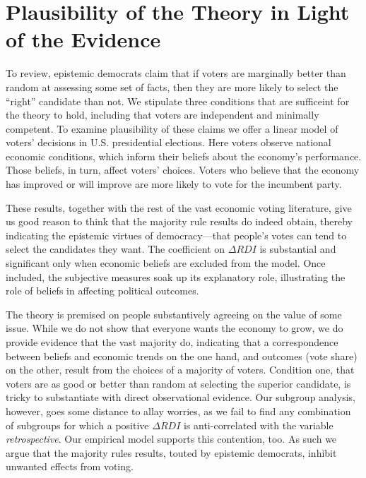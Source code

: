 \documentclass[11pt]{article}
\begin{document}
\section{Plausibility of the Theory in Light of the Evidence}
To review, epistemic democrats claim that if voters are marginally better than random at assessing some set of facts, then they are more likely to select the ``right'' candidate than not. We stipulate three conditions that are sufficeint for the theory to hold, including that voters are independent and minimally competent. To examine plausibility of these claims we offer a linear model of voters' decisions in U.S. presidential elections. Here voters observe national economic conditions, which inform their beliefs about the economy's performance. Those beliefs, in turn, affect voters' choices. Voters who believe that the economy has improved or will improve are more likely to vote for the incumbent party.

These results, together with the rest of the vast economic voting literature, give us good reason to think that  the majority rule results do indeed obtain, thereby indicating the epistemic virtues of democracy---that people's votes can tend to select the candidates they want. %
The coefficient on $\Delta RDI$  is substantial and significant only when economic beliefs are excluded from the model. Once included, the subjective measures soak up its explanatory role, illustrating the role of beliefs in affecting political outcomes. %

The theory is premised on people substantively agreeing on the value of some issue. While we do not show that everyone wants the economy to grow, we do provide evidence that the vast majority do, indicating that a correspondence between beliefs and economic trends on the one hand, and outcomes (vote share) on the other, result from the choices of a majority of voters. Condition one, that voters are as good or better than random at selecting the superior candidate, is tricky to substantiate with direct observational evidence. Our subgroup analysis, however, goes some distance to allay worries, as we fail to find any combination of subgroups for which a positive $\Delta RDI$  is anti-correlated with the variable \emph{retrospective}. Our empirical model supports this contention, too. As such we argue that the majority rules results, touted by epistemic democrats, inhibit unwanted effects from voting.
\end{document}
